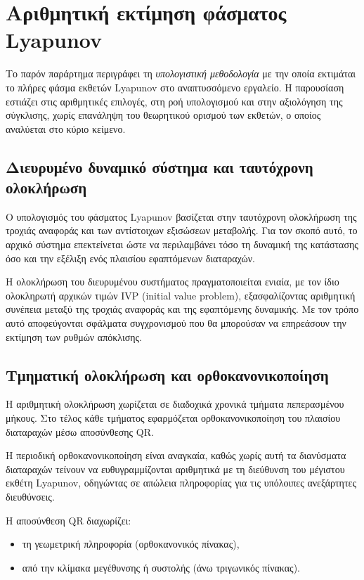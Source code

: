 \documentclass[11pt,a4paper]{report}
\begin{document}
\section{Αριθμητική εκτίμηση φάσματος Lyapunov}
\label{app:lyapunov}

Το παρόν παράρτημα περιγράφει τη \emph{υπολογιστική μεθοδολογία} με την οποία
εκτιμάται το πλήρες φάσμα εκθετών Lyapunov στο αναπτυσσόμενο εργαλείο.
Η παρουσίαση εστιάζει στις αριθμητικές επιλογές, στη ροή υπολογισμού και
στην αξιολόγηση της σύγκλισης, χωρίς επανάληψη του θεωρητικού ορισμού των
εκθετών, ο οποίος αναλύεται στο κύριο κείμενο.

\subsection{Διευρυμένο δυναμικό σύστημα και ταυτόχρονη ολοκλήρωση}

Ο υπολογισμός του φάσματος Lyapunov βασίζεται στην ταυτόχρονη ολοκλήρωση
της τροχιάς αναφοράς και των αντίστοιχων εξισώσεων μεταβολής.
Για τον σκοπό αυτό, το αρχικό σύστημα επεκτείνεται ώστε να περιλαμβάνει
τόσο τη δυναμική της κατάστασης όσο και την εξέλιξη ενός πλαισίου
εφαπτόμενων διαταραχών.

Η ολοκλήρωση του διευρυμένου συστήματος πραγματοποιείται ενιαία, με τον
ίδιο ολοκληρωτή αρχικών τιμών IVP (initial value problem), εξασφαλίζοντας αριθμητική συνέπεια
μεταξύ της τροχιάς αναφοράς και της εφαπτόμενης δυναμικής.
Με τον τρόπο αυτό αποφεύγονται σφάλματα συγχρονισμού που θα μπορούσαν
να επηρεάσουν την εκτίμηση των ρυθμών απόκλισης.

\subsection{Τμηματική ολοκλήρωση και ορθοκανονικοποίηση}

Η αριθμητική ολοκλήρωση χωρίζεται σε διαδοχικά χρονικά τμήματα πεπερασμένου
μήκους. Στο τέλος κάθε τμήματος εφαρμόζεται ορθοκανονικοποίηση του πλαισίου
διαταραχών μέσω αποσύνθεσης QR.

Η περιοδική ορθοκανονικοποίηση είναι αναγκαία, καθώς χωρίς αυτή τα
διανύσματα διαταραχών τείνουν να ευθυγραμμίζονται αριθμητικά με τη
διεύθυνση του μέγιστου εκθέτη Lyapunov, οδηγώντας σε απώλεια πληροφορίας
για τις υπόλοιπες ανεξάρτητες διευθύνσεις.

Η αποσύνθεση QR διαχωρίζει:
\begin{itemize}
  \item τη γεωμετρική πληροφορία (ορθοκανονικός πίνακας),
  \item από την κλίμακα μεγέθυνσης ή συστολής (άνω τριγωνικός πίνακας).
\end{itemize}
\end{document}
